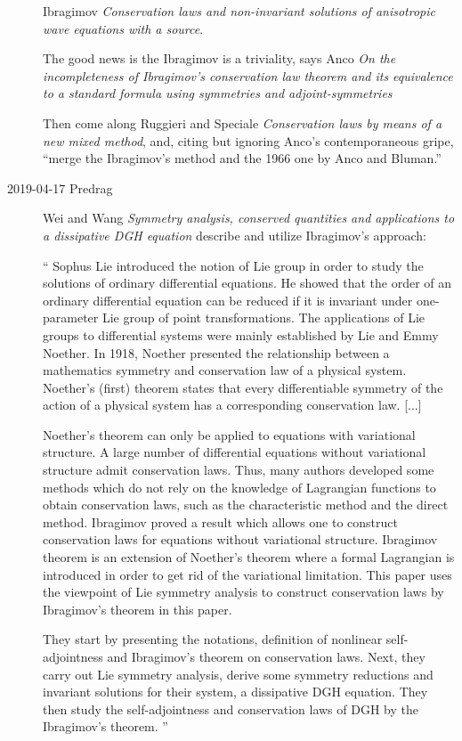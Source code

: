 \begin{description}
Ibragimov {\em Conservation laws and non-invariant solutions
of anisotropic wave equations with a source}.

The good news is the Ibragimov is a triviality, says Anco {\em
On the incompleteness of {Ibragimov}'s conservation law theorem and its
equivalence to a standard formula using symmetries and
adjoint-symmetries}

Then come along Ruggieri and Speciale
{\em Conservation laws by means of a new mixed method}, and,
citing but ignoring Anco's contemporaneous gripe,
``merge the Ibragimov's method and the 1966 one by Anco and Bluman.''

\item[2019-04-17 Predrag]
Wei and Wang {\em Symmetry analysis, conserved quantities and
applications to a dissipative {DGH} equation} describe and utilize Ibragimov's
approach:

``
Sophus Lie introduced the notion of Lie group in order to study the solutions of
ordinary differential equations. He showed
that the order of an ordinary differential equation can be reduced if it is
invariant under one-parameter Lie group of point transformations. The
applications of Lie groups to differential systems were mainly established by Lie
and Emmy Noether. In 1918, Noether presented the relationship between a
mathematics symmetry and conservation law of a physical system. Noether's (first)
theorem states that every differentiable symmetry of the action of a physical
system has a corresponding conservation law.
[...]

Noether's theorem can only be applied to equations with variational structure. A
large number of differential equations without variational structure admit
conservation laws. Thus, many authors developed some methods which do not rely on
the knowledge of Lagrangian functions to obtain conservation laws, such as the
characteristic method and the direct method.
Ibragimov proved a result which allows one to construct
conservation laws for equations without variational structure. Ibragimov theorem
is an extension of Noether's theorem where a formal Lagrangian is introduced in
order to get rid of the variational limitation. This paper uses the viewpoint of
Lie symmetry analysis to construct conservation laws by Ibragimov's theorem in
this paper.

They start by presenting the notations, definition of nonlinear self-adjointness
and Ibragimov's theorem on conservation laws. Next, they carry out Lie symmetry
analysis, derive some symmetry reductions and invariant solutions for their
system, a dissipative {DGH} equation. They then study the self-adjointness and
conservation laws of DGH by the Ibragimov's theorem.
''


\end{description}
